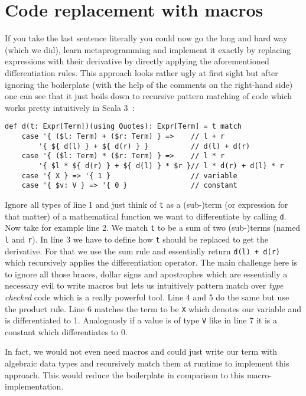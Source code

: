 \section{Code replacement with macros} \label{sec:macros}
If you take the last sentence literally you could now go the long and hard way (which we did), learn metaprogramming and implement it exactly by replacing expressions with their derivative by directly applying the aforementioned differentiation rules. This approach looks rather ugly at first sight but after ignoring the boilerplate (with the help of the comments on the right-hand side) one can see that it just boils down to recursive pattern matching of code which works pretty intuitively in Scala 3~\cite{maScala3}:
\pagebreak
\begin{lstlisting}
def d(t: Expr[Term])(using Quotes): Expr[Term] = t match
    case '{ ($l: Term) + ($r: Term) } =>    // l + r
        '{ ${ d(l) } + ${ d(r) } }          // d(l) + d(r)
    case '{ ($l: Term) * ($r: Term) } =>    // l * r
        '{ $l * ${ d(r) } + ${ d(l) } * $r }// l * d(r) + d(l) * r
    case '{ X } => '{ 1 }                   // variable
    case '{ $v: V } => '{ 0 }               // constant
\end{lstlisting}
 Ignore all types of line 1 and just think of \lstinline{t} as a (sub-)term (or expression for that matter) of a mathematical function we want to differentiate by calling \lstinline{d}. Now take for example line 2. We match \lstinline{t} to be a sum of two (sub-)terms (named \lstinline{l} and \lstinline{r}). In line 3 we have to define how \lstinline{t} should be replaced to get the derivative. For that we use the sum rule and essentially return \lstinline{d(l) + d(r)} which recursively applies the differentiation operator. The main challenge here is to ignore all those braces, dollar signs and apostrophes which are essentially a necessary evil to write macros but lets us intuitively pattern match over \emph{type checked} code which is a really powerful tool. Line 4 and 5 do the same but use the product rule. Line 6 matches the term to be \lstinline{X} which denotes our variable and is differentiated to 1. Analogously if a value is of type \lstinline{V} like in line 7 it is a constant which differentiates to 0.

In fact, we would not even need macros and could just write our term with algebraic data types and recursively match them at runtime to implement this approach. This would reduce the boilerplate in comparison to this macro-implementation.


